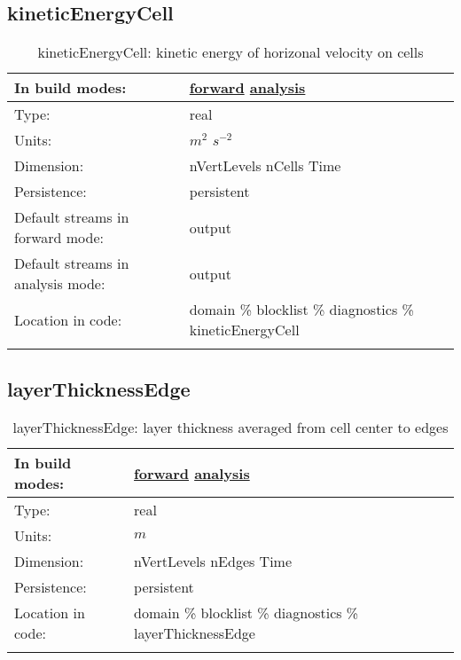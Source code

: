 \subsection[kineticEnergyCell]{kineticEnergyCell}
\label{subsec:var_sec_diagnostics_kineticEnergyCell}
\begin{center}
\begin{longtable}{| p{2.0in} | p{4.0in} |}
        \hline 
        In build modes: & \hyperref[subsec:forward_var_tab_diagnostics]{forward} \hyperref[subsec:analysis_var_tab_diagnostics]{analysis} \\
        \hline 
        Type: & real \\
        \hline 
        Units: & $m^2$ $s^{-2}$ \\
        \hline 
        Dimension: & nVertLevels nCells Time \\
        \hline 
        Persistence: & persistent \\
        \hline 
		 Default streams in forward mode: &  output \\
        \hline 
		 Default streams in analysis mode: &  output \\
        \hline 
		 Location in code: & domain \% blocklist \% diagnostics \% kineticEnergyCell \\
		 \hline 
    \caption{kineticEnergyCell: kinetic energy of horizonal velocity on cells}
\end{longtable}
\end{center}
\subsection[layerThicknessEdge]{layerThicknessEdge}
\label{subsec:var_sec_diagnostics_layerThicknessEdge}
\begin{center}
\begin{longtable}{| p{2.0in} | p{4.0in} |}
        \hline 
        In build modes: & \hyperref[subsec:forward_var_tab_diagnostics]{forward} \hyperref[subsec:analysis_var_tab_diagnostics]{analysis} \\
        \hline 
        Type: & real \\
        \hline 
        Units: & $m$ \\
        \hline 
        Dimension: & nVertLevels nEdges Time \\
        \hline 
        Persistence: & persistent \\
        \hline 
		 Location in code: & domain \% blocklist \% diagnostics \% layerThicknessEdge \\
		 \hline 
    \caption{layerThicknessEdge: layer thickness averaged from cell center to edges}
\end{longtable}
\end{center}

